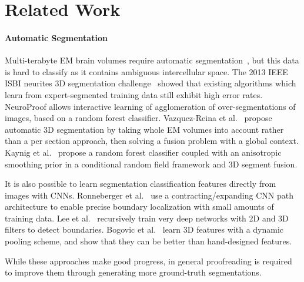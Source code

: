 \section{Related Work}


\paragraph{Automatic Segmentation}

Multi-terabyte EM brain volumes require automatic segmentation~\cite{jain2010,kaynig13,Liu2014,NunezIglesias2013Machine,GALA2014,amelio_segmentation}, but this data is hard to classify as it contains ambiguous intercellular space. The 2013 IEEE ISBI neurites 3D segmentation challenge~\cite{isbi_challenge} showed that existing algorithms which learn from expert-segmented training data still exhibit high error rates. NeuroProof \cite{neuroproof2013} allows interactive learning of agglomeration of over-segmentations of images, based on a random forest classifier. Vazquez-Reina et al.~\cite{amelio_segmentation} propose automatic 3D segmentation by taking whole EM volumes into account rather than a per section approach, then solving a fusion problem with a global context. Kaynig et al.~\cite{kaynig13} propose a random forest classifier coupled with an anisotropic smoothing prior in a conditional random field framework and 3D segment fusion. 

It is also possible to learn segmentation classification features directly from images with CNNs. Ronneberger et al.~\cite{RonnebergerFB15} use a contracting/expanding CNN path architecture to enable precise boundary localization with small amounts of training data. Lee et al.~\cite{lee2015recursive} recursively train very deep networks with 2D and 3D filters to detect boundaries. Bogovic et al.~\cite{BogovicHJ13} learn 3D features with a dynamic pooling scheme, and show that they can be better than hand-designed features. 

While these approaches make good progress, in general proofreading is required to improve them through generating more ground-truth segmentations.


